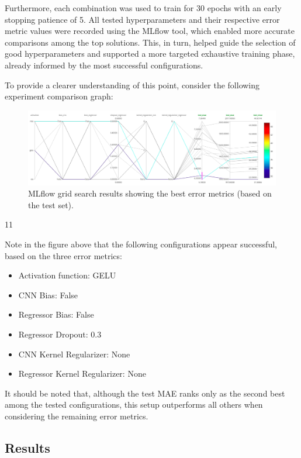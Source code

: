 \documentclass[sigconf,natbib=false]{acmart}
\begin{document}
Furthermore, each combination was used to train for 30 epochs with an early stopping patience of 5. All tested hyperparameters and their respective error metric values were recorded using the MLflow tool, which enabled more accurate comparisons among the top solutions. This, in turn, helped guide the selection of good hyperparameters and supported a more targeted exhaustive training phase, already informed by the most successful configurations.

To provide a clearer understanding of this point, consider the following experiment comparison graph:

\begin{figure}[h]
 \centering
 \includegraphics[width=\linewidth]{figs/graph_grid_search.png}
 \caption{MLflow grid search results showing the best error metrics (based on the test set).}
\end{figure}11

Note in the figure above that the following configurations appear successful, based on the three error metrics:

\begin{itemize}
\item Activation function: GELU
\item CNN Bias: False
\item Regressor Bias: False
\item Regressor Dropout: 0.3
\item CNN Kernel Regularizer: None
\item Regressor Kernel Regularizer: None
\end{itemize}

It should be noted that, although the test MAE ranks only as the second best among the tested configurations, this setup outperforms all others when considering the remaining error metrics.

\subsection{Results}
\end{document}
